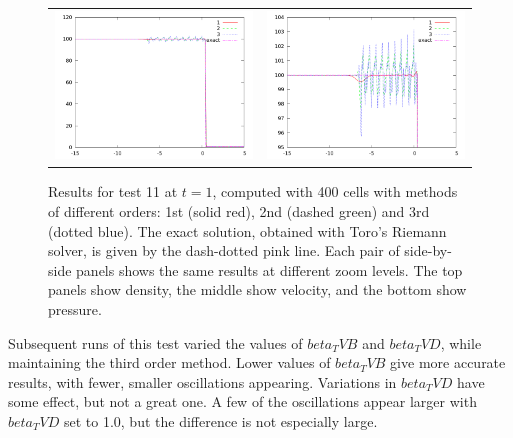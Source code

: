\documentclass[10pt]{article}
\begin{document}
\begin{figure}[h]
\begin{center}
\begin{tabular}{cc}
      \includegraphics[width=.4\textwidth]{prs_T11.png} &	
      \includegraphics[width=.4\textwidth]{prs11zoom.png} \\
	\end{tabular}	
  \end{center}
  \caption{Results for test 11 at $t=1$, computed with 400 cells with methods of different orders: 1st (solid red), 2nd (dashed green) and 3rd (dotted blue). The exact solution, obtained with Toro's Riemann solver, is given by the dash-dotted pink line. Each pair of side-by-side panels shows the same results at different zoom levels. The top panels show density, the middle show velocity, and the bottom show pressure.}
\end{figure}
Subsequent runs of this test varied the values of $beta_TVB$ and $beta_TVD$, while maintaining the third order method. Lower values of $beta_TVB$ give more accurate results, with fewer, smaller oscillations appearing. Variations in $beta_TVD$ have some effect, but not a great one. A few of the oscillations appear larger with $beta_TVD$ set to 1.0, but the difference is not especially large.
\end{document}
